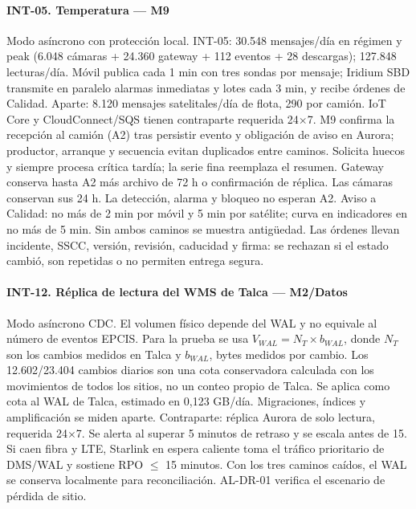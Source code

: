\paragraph{INT-05. Temperatura — M9}
Modo asíncrono con protección local. INT-05: 30.548 mensajes/día en régimen y peak (6.048 cámaras + 24.360 gateway + 112 eventos + 28 descargas); 127.848 lecturas/día. Móvil publica cada 1 min con tres sondas por mensaje; Iridium SBD transmite en paralelo alarmas inmediatas y lotes cada 3 min, y recibe órdenes de Calidad. Aparte: 8.120 mensajes satelitales/día de flota, 290 por camión. IoT Core y CloudConnect/SQS tienen contraparte requerida 24$\times$7. M9 confirma la recepción al camión (A2) tras persistir evento y obligación de aviso en Aurora; productor, arranque y secuencia evitan duplicados entre caminos. Solicita huecos y siempre procesa crítica tardía; la serie fina reemplaza el resumen. Gateway conserva hasta A2 más archivo de 72 h o confirmación de réplica. Las cámaras conservan sus 24 h. La detección, alarma y bloqueo no esperan A2. Aviso a Calidad: no más de 2 min por móvil y 5 min por satélite; curva en indicadores en no más de 5 min. Sin ambos caminos se muestra antigüedad. Las órdenes llevan incidente, SSCC, versión, revisión, caducidad y firma: se rechazan si el estado cambió, son repetidas o no permiten entrega segura.

\paragraph{INT-12. Réplica de lectura del WMS de Talca — M2/Datos}
Modo asíncrono CDC. El volumen físico depende del WAL y no equivale al número de eventos EPCIS. Para la prueba se usa $V_{WAL}=N_T\times b_{WAL}$, donde $N_T$ son los cambios medidos en Talca y $b_{WAL}$, bytes medidos por cambio. Los 12.602/23.404 cambios diarios son una cota conservadora calculada con los movimientos de todos los sitios, no un conteo propio de Talca. Se aplica como cota al WAL de Talca, estimado en 0,123 GB/día. Migraciones, índices y amplificación se miden aparte. Contraparte: réplica Aurora de solo lectura, requerida 24$\times$7. Se alerta al superar 5 minutos de retraso y se escala antes de 15. Si caen fibra y LTE, Starlink en espera caliente toma el tráfico prioritario de DMS/WAL y sostiene RPO $\leq$ 15 minutos. Con los tres caminos caídos, el WAL se conserva localmente para reconciliación. AL-DR-01 verifica el escenario de pérdida de sitio.

